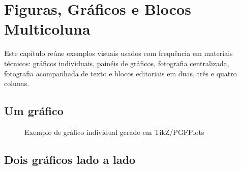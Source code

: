 \chapter{Figuras, Gráficos e Blocos Multicoluna}

Este capítulo reúne exemplos visuais usados com frequência em materiais técnicos: gráficos individuais, painéis de gráficos, fotografia centralizada, fotografia acompanhada de texto e blocos editoriais em duas, três e quatro colunas.

\ifVSColor
  \def\VSPlotAColor{VSRed}
  \def\VSPlotBColor{VSTeal}
  \def\VSPlotCColor{VSBlack}
  \def\VSPlotDColor{VSSilver}
\else
  \def\VSPlotAColor{VSBlack}
  \def\VSPlotBColor{VSMutedText}
  \def\VSPlotCColor{VSBlack}
  \def\VSPlotDColor{VSSilver}
\fi

\section{Um gráfico}

\begin{figure}[H]
\centering
{}
\caption{Exemplo de gráfico individual gerado em TikZ/PGFPlots}
\label{fig:grafico-unico}
\end{figure}

\section{Dois gráficos lado a lado}

